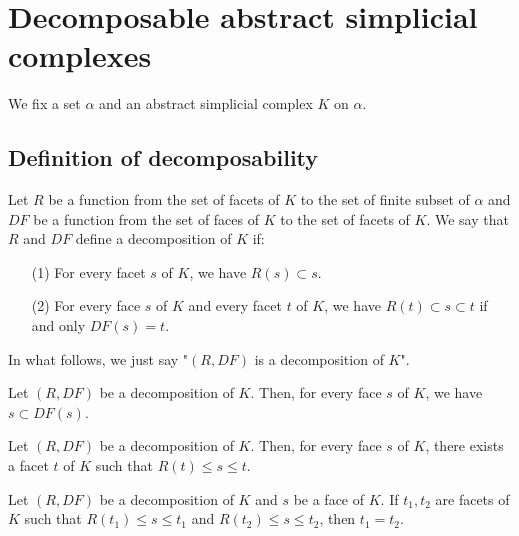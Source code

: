 \section{Decomposable abstract simplicial complexes}

We fix a set $\alpha$ and an abstract simplicial complex $K$ on $\alpha$.

\subsection{Definition of decomposability}

\begin{subdefi}[IsDecomposition]
Let $R$ be a function from the set of facets of $K$ to the set of finite subset of $\alpha$ and $DF$ be a function
from the set of faces of $K$ to the set of facets of $K$.
We say that $R$ and $DF$ define a decomposition of $K$ if:
\begin{itemize}
\item[(1)] For every facet $s$ of $K$, we have $R(s)\subset s$.
\item[(2)] For every face $s$ of $K$ and every facet $t$ of $K$, we have $R(t)\subset s\subset t$ if and only $DF(s)=t$.

\end{itemize}
\end{subdefi}

In what follows, we just say "$(R,DF)$ is a decomposition of $K$".

\begin{sublemma}
Let $(R,DF)$ be a decomposition of $K$.
Then, for every face $s$ of $K$, we have $s\subset DF(s)$.

\end{sublemma}

\begin{sublemma}
Let $(R,DF)$ be a decomposition of $K$.
Then, for every face $s$ of $K$, there exists a facet $t$ of $K$ such that $R(t)\le s\le t$.

\end{sublemma}

\begin{sublemma}
Let $(R,DF)$ be a decomposition of $K$ and $s$ be a face of $K$.
If $t_1,t_2$ are facets of $K$ such that $R(t_1)\le s\le t_1$ and $R(t_2)\le s\le t_2$, then
$t_1=t_2$.

\end{sublemma}


